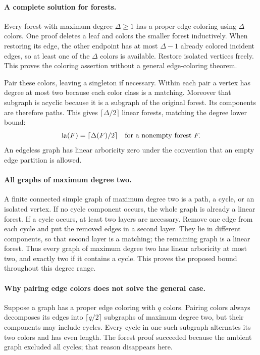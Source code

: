 \documentclass[11pt,a4paper]{article}
\begin{document}
\paragraph{A complete solution for forests.}
Every forest with maximum degree $\Delta\ge1$ has a proper edge
coloring using $\Delta$ colors. One proof deletes a leaf and colors
the smaller forest inductively. When restoring its edge, the other
endpoint has at most $\Delta-1$ already colored incident edges, so
at least one of the $\Delta$ colors is available. Restore isolated
vertices freely. This proves the coloring assertion without a general
edge-coloring theorem.

Pair these colors, leaving a singleton if necessary. Within each
pair a vertex has degree at most two because each color class is a
matching. Moreover that subgraph is acyclic because it is a subgraph
of the original forest. Its components are therefore paths. This
gives $\lceil\Delta/2\rceil$ linear forests, matching the degree
lower bound:
\[
                 \operatorname{la}(F)=\lceil\Delta(F)/2\rceil
                 \quad\hbox{for a nonempty forest }F.
\]
An edgeless graph has linear arboricity zero under the convention
that an empty edge partition is allowed.

\paragraph{All graphs of maximum degree two.}
A finite connected simple graph of maximum degree two is a path, a
cycle, or an isolated vertex. If no cycle component occurs, the whole
graph is already a linear forest. If a cycle occurs, at least two
layers are necessary. Remove one edge from each cycle and put the
removed edges in a second layer. They lie in different components,
so that second layer is a matching; the remaining graph is a linear
forest. Thus every graph of maximum degree two has linear arboricity
at most two, and exactly two if it contains a cycle. This proves
the proposed bound throughout this degree range.

\paragraph{Why pairing edge colors does not solve the general case.}
Suppose a graph has a proper edge coloring with $q$ colors. Pairing
colors always decomposes its edges into $\lceil q/2\rceil$ subgraphs
of maximum degree two, but their components may include cycles. Every
cycle in one such subgraph alternates its two colors and has even
length. The forest proof succeeded because the ambient graph excluded
all cycles; that reason disappears here.
\end{document}
